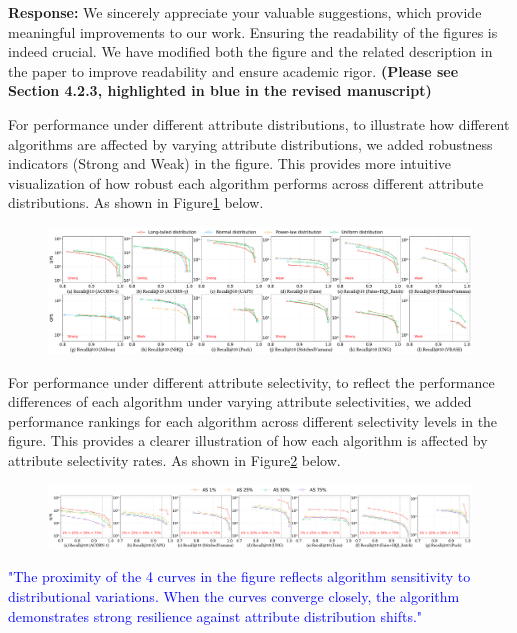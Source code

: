 \documentclass[sigconf, nonacm]{acmart}
\begin{document}
\noindent
\textbf{Response:} We sincerely appreciate your valuable suggestions, which provide meaningful improvements to our work. Ensuring the readability of the figures is indeed crucial. We have modified both the figure and the related description in the paper to improve readability and ensure academic rigor. \textbf{(Please see Section 4.2.3, highlighted in blue in the revised manuscript)}

For performance under different attribute distributions, to illustrate how different algorithms are affected by varying attribute distributions, we added robustness indicators (Strong and Weak) in the figure. This provides more intuitive visualization of how robust each algorithm performs across different attribute distributions. As shown in Figure\ref{fig:attribute_distribution} below.

\begin{figure}[htbp]
	\centering
	\includegraphics[width=\linewidth]{fig/exp_3_1.pdf}
	\caption{}
	\label{fig:attribute_distribution}
\end{figure}

For performance under different attribute selectivity, to reflect the performance differences of each algorithm under varying attribute selectivities, we added performance rankings for each algorithm across different selectivity levels in the figure. This provides a clearer illustration of how each algorithm is affected by attribute selectivity rates. As shown in Figure\ref{fig:attribute_selectivity} below.

\begin{figure}[htbp]
	\centering
	\includegraphics[width=\linewidth]{fig/exp_5_2_1.pdf}
	\caption{}
	\label{fig:attribute_selectivity}
\end{figure}

\textcolor{blue}{"The proximity of the 4 curves in the figure reflects algorithm sensitivity to distributional variations. When the curves converge closely, the algorithm demonstrates strong resilience against attribute distribution shifts."}
\end{document}
